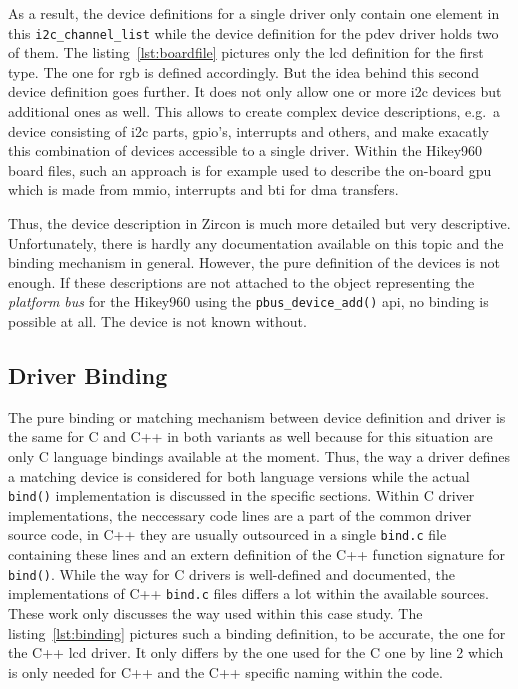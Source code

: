 As a result, the device definitions for a single driver only contain one element in this \texttt{i2c_channel_list} while the device definition for the pdev driver holds two of them.
The listing~\ref{lst:boardfile} pictures only the \ac{lcd} definition for the first type.
The one for \ac{rgb} is defined accordingly.
But the idea behind this second device definition goes further.
It does not only allow one or more \ac{i2c} devices but additional ones as well.
This allows to create complex device descriptions, e.g.\ a device consisting of \ac{i2c} parts, \ac{gpio}'s, interrupts and others, and make exacatly this combination of devices accessible to a single driver.
Within the Hikey960 board files, such an approach is for example used to describe the on-board \ac{gpu} which is made from \ac{mmio}, interrupts and \ac{bti} for \ac{dma} transfers.

Thus, the device description in Zircon is much more detailed but very descriptive.
Unfortunately, there is hardly any documentation available on this topic and the binding mechanism in general.
However, the pure definition of the devices is not enough.
If these descriptions are not attached to the object representing the \textit{platform bus} for the Hikey960 using the \texttt{pbus_device_add()} \ac{api}, no binding is possible at all.
The device is not known without.

\subsection{Driver Binding}
The pure binding or matching mechanism between device definition and driver is the same for C and C++ in both variants as well because for this situation are only C language bindings available at the moment.
Thus, the way a driver defines a matching device is considered for both language versions while the actual \texttt{bind()} implementation is discussed in the specific sections.
Within C driver implementations, the neccessary code lines are a part of the common driver source code, in C++ they are usually outsourced in a single \texttt{bind.c} file containing these lines and an extern definition of the C++ function signature for \texttt{bind()}.
While the way for C drivers is well-defined and documented, the implementations of C++ \texttt{bind.c} files differs a lot within the available sources.
These work only discusses the way used within this case study.
The listing~\ref{lst:binding} pictures such a binding definition, to be accurate, the one for the C++ \ac{lcd} driver.
It only differs by the one used for the C one by line 2 which is only needed for C++ and the C++ specific naming within the code.

